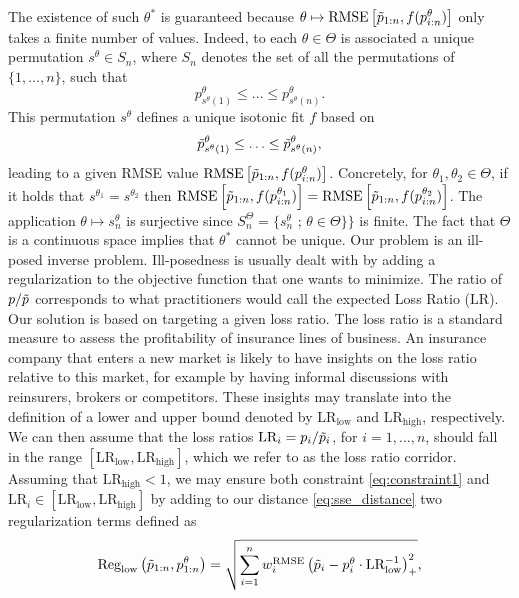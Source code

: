 \documentclass[10pt]{article}
\begin{document}
The existence of such $\theta^\ast$ is guaranteed because $\theta\mapsto \text{RMSE}\left[\Tilde{p}_{1:n}, f(p^\theta_{i:n})\right]$ only takes a finite number of values. Indeed, to each $\theta \in \Theta$ is associated a unique permutation $s^\theta\in S_n$, where $S_n$ denotes the set of all the permutations of $\{1,\ldots, n\}$, such that 
$$
p^\theta_{s^\theta(1)}\leq\ldots\leq p^\theta_{s^\theta(n)}.
$$
This permutation $s^\theta$ defines a unique isotonic fit $f$ based on 
$$
\Tilde{p}^\theta_{s^\theta(1)}\leq\ldots\leq \Tilde{p}^\theta_{s^\theta(n)},
$$
leading to a given RMSE value $\text{RMSE}\left[\Tilde{p}_{1:n}, f(p^\theta_{i:n})\right]$. Concretely, for $\theta_1,\theta_2\in \Theta$, if it holds that $s^{\theta_1} = s^{\theta_2}$ then $\text{RMSE}\left[\Tilde{p}_{1:n}, f(p^{\theta_1}_{i:n})\right] = \text{RMSE}\left[\Tilde{p}_{1:n}, f(p^{\theta_2}_{i:n})\right]$. The application $\theta\mapsto s_n^\theta$ is surjective since $S_n^\Theta = \{s_n^\theta\text{ ; }\theta\in \Theta\}\}$  is finite.  The fact that $\Theta$ is a continuous space implies that $\theta^\ast$ cannot be unique. Our problem is an ill-posed inverse problem. Ill-posedness is usually dealt with by adding a regularization to the objective function that one wants to minimize. The ratio of \(p / \Tilde{p}\) corresponds to what practitioners would call the expected Loss Ratio (\(\text{LR}\)). Our solution is based on targeting a given loss ratio.  The loss ratio is a standard measure to assess the profitability of insurance lines of business. An insurance company that enters a new market is likely to have insights on the loss ratio relative to this market, for example by having informal discussions with reinsurers, brokers or competitors. These insights may translate into the definition of a lower and upper bound denoted by \(\text{LR}_{\text{low}}\) and \(\text{LR}_{\text{high}}\), respectively. We can then assume that the loss ratios \(\text{LR}_i = p_i / \Tilde{p}_i\), for \(i = 1, \ldots, n\), should fall in the range \([\text{LR}_{\text{low}}, \text{LR}_{\text{high}}]\), which we refer to as the loss ratio corridor. Assuming that \(\text{LR}_{\text{high}} < 1\), we may ensure both constraint \eqref{eq:constraint1} and \(\text{LR}_i \in [\text{LR}_{\text{low}}, \text{LR}_{\text{high}}]\) by adding to our distance \eqref{eq:sse_distance} two regularization terms defined as
\begin{equation*}\label{eq:LR_bounds1}
\text{Reg}_{\text{low}}\left(\Tilde{p}_{1:n}, p_{1:n}^\theta\right) = \sqrt{\sum_{i=1}^nw_i^{\text{RMSE}}\left(\Tilde{p}_i - p_i^\theta \cdot \text{LR}_{\text{low}}^{-1}\right)_+^2}, 
\end{equation*}
\end{document}
